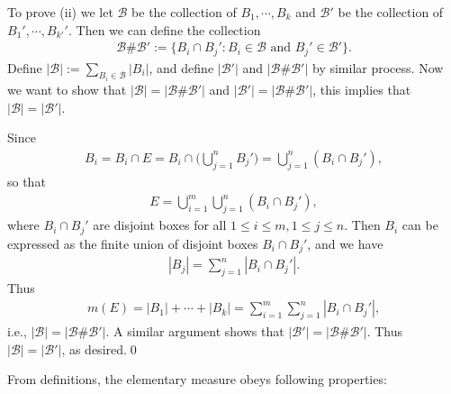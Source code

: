 \documentclass{book}
\theoremstyle{defstyle}
\theoremstyle{thmstyle}
\newcommand{\newa}{\vspace{1em}\indent}
\begin{document}
To prove (ii) we let $\mathcal{B}$ be the collection of $B_1, \cdots, B_k$ and $\mathcal{B}'$ be the collection of $B_1', \cdots, B_{k'}'$. Then we can define the collection
    \begin{align*}
        \mathcal{B}\#\mathcal{B}' := \{B_i \cap B_j' : B_i \in \mathcal{B} \text{ and } B_j' \in \mathcal{B}'\}.
    \end{align*}
Define $|\mathcal{B}| := \sum_{B_i \in \mathcal{B}}|B_i|$, and define $|\mathcal{B}'|$ and $|\mathcal{B}\#\mathcal{B}'|$ by similar process. Now we want to show that $|\mathcal{B}| = |\mathcal{B}\#\mathcal{B}'|$ and $|\mathcal{B}'| = |\mathcal{B}\#\mathcal{B}'|$, this implies that $|\mathcal{B}| = |\mathcal{B}'|$.

Since
    \begin{align*}
        B_i
        = B_i \cap E
        = B_i \cap \Big(\bigcup_{j = 1}^{n} B_j'\Big)
        = \bigcup_{j = 1}^{n} (B_i \cap B_j'),
    \end{align*}
so that
    \begin{align*}
        E = \bigcup_{i = 1}^{m}\bigcup_{j = 1}^{n}(B_i \cap B_j'),
    \end{align*}
where $B_i \cap B_j'$ are disjoint boxes for all $1 \leq i \leq m, 1 \leq j \leq n$. Then $B_i$ can be expressed as the finite union of disjoint boxes $B_i \cap B_j'$, and we have
    \begin{align*}
        |B_j| = \sum_{j = 1}^{n}|B_i \cap B_j'|.
    \end{align*}
Thus
    \begin{align*}
        m(E) = |B_1| + \cdots + |B_k|
        = \sum_{i = 1}^{m}\sum_{j = 1}^{n}|B_i \cap B_j'|,
    \end{align*}
i.e., $|\mathcal{B}| = |\mathcal{B}\#\mathcal{B}'|$. A similar argument shows that $|\mathcal{B}'| = |\mathcal{B}\#\mathcal{B}'|$. Thus $|\mathcal{B}| = |\mathcal{B}'|$, as desired.\qed

\newa From definitions, the elementary measure obeys following properties:
\end{document}
